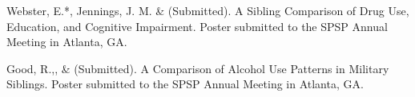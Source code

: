 \item Webster, E.*, Jennings, J. M. \& \meb (Submitted). A Sibling Comparison of Drug Use, Education, and Cognitive Impairment. Poster submitted to the SPSP Annual Meeting in Atlanta, GA.

\item Good, R.,\noteA \yrh, \&  \meb (Submitted). A Comparison of Alcohol Use Patterns in Military Siblings.  Poster submitted to the SPSP Annual Meeting in Atlanta, GA.

%
%

%

%

%

%

